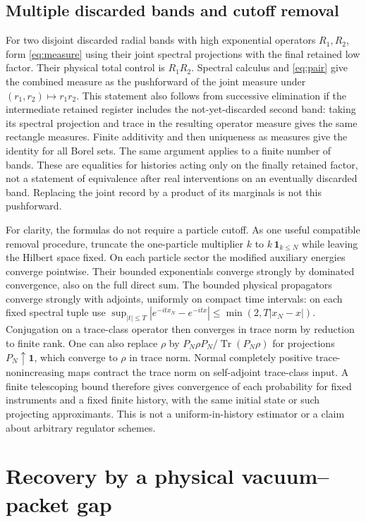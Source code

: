 \documentclass[11pt]{article}
\newcommand{\tr}{\operatorname{Tr}}
\newcommand{\one}{\mathbf 1}
\begin{document}
\subsection{Multiple discarded bands and cutoff removal}

For two disjoint discarded radial bands with high exponential operators \(R_1,R_2\), form \eqref{eq:measure} using their joint spectral projections with the final retained low factor. Their physical total control is \(R_1R_2\). Spectral calculus and \eqref{eq:pair} give the combined measure as the pushforward of the joint measure under \((r_1,r_2)\mapsto r_1r_2\). This statement also follows from successive elimination if the intermediate retained register includes the not-yet-discarded second band: taking its spectral projection and trace in the resulting operator measure gives the same rectangle measures. Finite additivity and then uniqueness as measures give the identity for all Borel sets. The same argument applies to a finite number of bands. These are equalities for histories acting only on the finally retained factor, not a statement of equivalence after real interventions on an eventually discarded band. Replacing the joint record by a product of its marginals is not this pushforward.

For clarity, the formulas do not require a particle cutoff. As one useful compatible removal procedure, truncate the one-particle multiplier \(k\) to \(k\,\one_{k\leq N}\) while leaving the Hilbert space fixed. On each particle sector the modified auxiliary energies converge pointwise. Their bounded exponentials converge strongly by dominated convergence, also on the full direct sum. The bounded physical propagators converge strongly with adjoints, uniformly on compact time intervals: on each fixed spectral tuple use \(\sup_{|t|\leq T}|e^{-itx_N}-e^{-itx}|\leq \min(2,T|x_N-x|)\). Conjugation on a trace-class operator then converges in trace norm by reduction to finite rank. One can also replace \(\rho\) by \(P_N\rho P_N/\tr(P_N\rho)\) for projections \(P_N\uparrow\one\), which converge to \(\rho\) in trace norm. Normal completely positive trace-nonincreasing maps contract the trace norm on self-adjoint trace-class input. A finite telescoping bound therefore gives convergence of each probability for fixed instruments and a fixed finite history, with the same initial state or such projecting approximants. This is not a uniform-in-history estimator or a claim about arbitrary regulator schemes.

\section{Recovery by a physical vacuum--packet gap}\label{sec:recovery}
\end{document}
